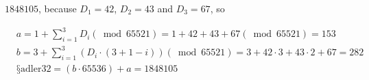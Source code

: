 \begin{Answer}[ref={ex-adler32}]

  $1848105$, because $D_1 = 42$, $D_2 = 43$ and $D_3 = 67$, so

  \begin{align*}
      & a = 1 +  \displaystyle\sum_{i = 1}^{3}D_i (\bmod{65521}) = 1 + 42 +
      43 + 67 (\bmod{65521}) = 153 \\
      & b = 3 + \displaystyle\sum_{i = 1}^{3}(D_i \cdot (3 + 1 - i))
      (\bmod{65521}) = 3 + 42 \cdot 3 + 43 \cdot 2 + 67  = 282 \\
      & §\text{adler32} = (b \cdot 65536) + a = 1848105
  \end{align*}

\end{Answer}

\endgroup